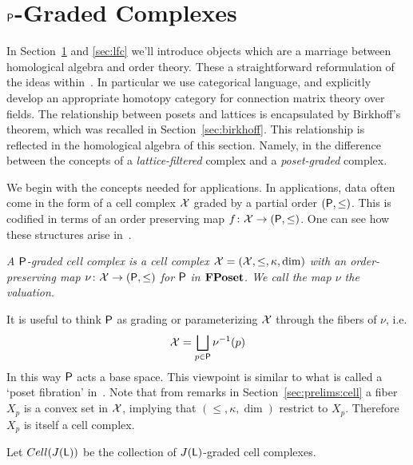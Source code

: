 

\section{${\mathsf P}$-Graded Complexes}\label{sec:grad}

In Section~\ref{sec:grad} and \ref{sec:lfc} we'll introduce objects which are a marriage between homological algebra and order theory.  These a straightforward reformulation of the ideas within~\cite[Section 7]{robbin:salamon2}.  In particular we use categorical language, and explicitly develop an appropriate homotopy category for connection matrix theory over fields.    The relationship between posets and lattices is encapsulated by Birkhoff's theorem, which was recalled in Section~\ref{sec:birkhoff}.  This relationship is reflected in the homological algebra of this section.  Namely, in the difference between the concepts of a {\em lattice-filtered} complex and a {\em poset-graded} complex.  

We begin with the concepts needed for applications.  In applications, data often come in the form of a cell complex ${\mathcal X}$ graded by a partial order $({\mathsf P},\leq)$.  This is codified in terms of an order preserving map $f\colon {\mathcal X}\to ({\mathsf P},\leq)$.   One can see how these structures arise in~\cite{braids}.  

\begin{defn}
{\em
A {\em ${\mathsf P}$-graded cell complex} is a cell complex ${\mathcal X}=({\mathcal X},\leq,\kappa,\dim)$ with an order-preserving map $\nu \colon {\mathcal X}\to ({\mathsf P},\leq)$ for ${\mathsf P}$ in ${\bf FPoset}$.   We call the map $\nu$ the {\em valuation}.
}
\end{defn}

\begin{rem}
It is useful to think ${\mathsf P}$ as grading or parameterizing ${\mathcal X}$ through the fibers of $\nu$, i.e. $${\mathcal X}=\bigsqcup_{p\in {\mathsf P}} \nu^{-1}(p)$$  In this way ${\mathsf P}$ acts a base space.  This viewpoint is similar to what is called a `poset fibration' in~\cite{koz}.  Note that from remarks in Section~\ref{sec:prelims:cell} a fiber $X_p$ is a convex set in ${\mathcal X}$, implying that $(\leq,\kappa,\dim)$ restrict to $X_p$.  Therefore $X_p$ is itself a cell complex.
\end{rem}

Let $Cell(J({\mathsf L}))$ be the collection of $J({\mathsf L})$-graded cell complexes. 

